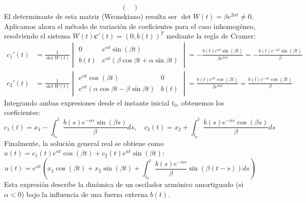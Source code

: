 {\[\begin{pmatrix}
        \end{pmatrix}
    \]
    El determinante de esta matriz (Wronskiano) resulta ser $\det W(t) = \beta e^{2 \alpha t} \neq 0$. Aplicamos ahora el método de variación de coeficientes para el caso inhomogéneo, resolviendo el sistema $W(t) \mathbf{c}'(t) = (0, b(t))^T$ mediante la regla de Cramer:
    \begin{align*}
        c_1'(t) &= \frac{1}{\det W(t)} \begin{vmatrix} 0 & e^{\alpha t} \sin(\beta t) \\ b(t) & e^{\alpha t}(\beta \cos \beta t + \alpha \sin \beta t) \end{vmatrix} = -\frac{b(t)e^{\alpha t} \sin(\beta t)}{\beta e^{2\alpha t}} = -\frac{b(t)e^{-\alpha t} \sin(\beta t)}{\beta} \\
        c_2'(t) &= \frac{1}{\det W(t)} \begin{vmatrix} e^{\alpha t} \cos(\beta t) & 0 \\ e^{\alpha t}(\alpha \cos \beta t - \beta \sin \beta t) & b(t) \end{vmatrix} = \frac{b(t)e^{\alpha t} \cos(\beta t)}{\beta e^{2\alpha t}} = \frac{b(t)e^{-\alpha t} \cos(\beta t)}{\beta}
    \end{align*}
    Integrando ambas expresiones desde el instante inicial $t_0$, obtenemos los coeficientes:
    \[
        c_1(t) = x_1 - \int_{t_0}^{t} \frac{b(s)e^{-\alpha s} \sin(\beta s)}{\beta} ds, \quad c_2(t) = x_2 + \int_{t_0}^{t} \frac{b(s)e^{-\alpha s} \cos(\beta s)}{\beta} ds
    \]
    Finalmente, la solución general real se obtiene como $u(t) = c_1(t) e^{\alpha t} \cos(\beta t) + c_2(t) e^{\alpha t} \sin(\beta t)$:
    \[
        u(t) = e^{\alpha t} \left( x_1 \cos(\beta t) + x_2 \sin(\beta t) + \int_{t_0}^{t} \frac{b(s)e^{-\alpha s}}{\beta} \sin(\beta(t-s)) ds \right)
    \]
    Esta expresión describe la dinámica de un oscilador armónico amortiguado (si $\alpha < 0$) bajo la influencia de una fuerza externa $b(t)$.
}




